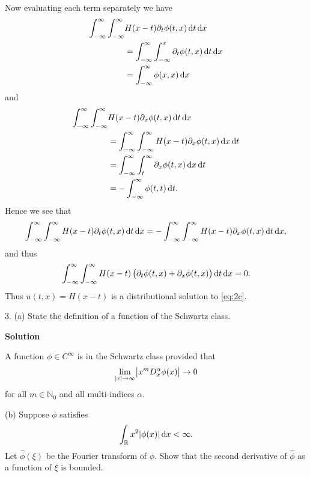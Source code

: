 \documentclass{article}
\begin{document}
%
Now evaluating each term separately we have
%
\begin{align*}
    \int_{-\infty}^\infty \int_{-\infty}^\infty& H(x - t) \partial_t \phi(t, x) \dif t \dif x \\
        &= \int_{-\infty}^\infty \int_{-\infty}^x \partial_t \phi(t, x) \dif t \dif x \\
        &= \int_{-\infty}^\infty \phi(x, x) \dif x
\end{align*}
%
and
%
\begin{align*}
    \int_{-\infty}^\infty \int_{-\infty}^\infty& H(x - t) \partial_x \phi(t, x) \dif t \dif x \\
        &= \int_{-\infty}^\infty \int_{-\infty}^\infty H(x - t) \partial_x \phi(t, x) \dif x \dif t \\
        &= \int_{-\infty}^\infty \int_t^\infty \partial_x \phi(t, x) \dif x \dif t \\
        &= - \int_{-\infty}^\infty \phi(t, t) \dif t
        .
\end{align*}
%
Hence we see that
%
\begin{equation*}
    \int_{-\infty}^\infty \int_{-\infty}^\infty H(x - t) \partial_t \phi(t, x) \dif t \dif x \\
    = -\int_{-\infty}^\infty \int_{-\infty}^\infty H(x - t) \partial_x \phi(t, x) \dif t \dif x
    ,
\end{equation*}
%
and thus
%
\begin{equation*}
    \int_{-\infty}^\infty \int_{-\infty}^\infty
        H(x - t) \del{\partial_t \phi(t, x) + \partial_x \phi(t, x)}
    \dif t \dif x
    = 0
    .
\end{equation*}
%
Thus $u(t, x) = H(x - t)$ is a distributional solution to \eqref{eq:2c}.

\newpage

3. (a) State the definition of a function of the Schwartz class.

\textbf{Solution}

A function $\phi \in C^\infty$ is in the Schwartz class provided that
%
\begin{equation*}
    \lim_{|x| \to \infty} \envert{x^m D_x^\alpha \phi(x)} \to 0
\end{equation*}
%
for all $m \in \mathbb{N}_0$ and all multi-indices $\alpha$.

\vspace{5mm}

(b) Suppose $\phi$ satisfies
%
\begin{equation*}
    \int_{\mathbb{R}} x^2 |\phi(x)| \dif x < \infty
    .
\end{equation*}
%
Let $\widehat{\phi}(\xi)$ be the Fourier transform of $\phi$. Show that
the second derivative of $\widehat{\phi}$ as a function of $\xi$ is
bounded.
\end{document}
